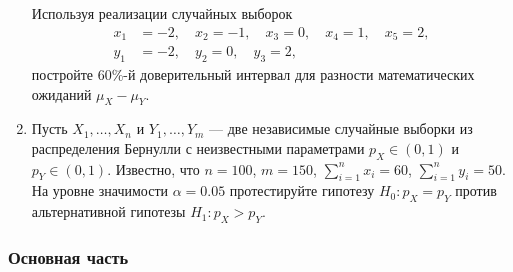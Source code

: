 \begin{enumerate}
Используя реализации случайных выборок
\begin{align*}
x_{1} &= -2, \quad x_{2} = -1, \quad x_{3} = 0, \quad x_{4} = 1, \quad x_{5} = 2, \\
y_{1} &= -2, \quad y_{2} = 0, \quad y_{3} = 2,
\end{align*}
постройте 60\%-й доверительный интервал для разности математических ожиданий
$\mu_{X} - \mu_{Y}$.

\item Пусть $X_{1}, \ldots, X_{n}$ и $Y_{1}, \ldots, Y_{m}$ — две независимые случайные выборки из распределения Бернулли с неизвестными параметрами $p_{X}\in(0,1)$ и $p_{Y}\in(0,1)$. Известно, что $n=100$, $m=150$, $\sum_{i=1}^{n}x_{i}=60$, $\sum_{i=1}^{n}y_{i}=50$. На уровне значимости $\alpha=0.05$ протестируйте гипотезу $H_{0}:p_{X}=p_{Y}$ против альтернативной гипотезы $H_{1}:p_{X}>p_{Y}$.


\end{enumerate}

\subsubsection*{Основная часть}



